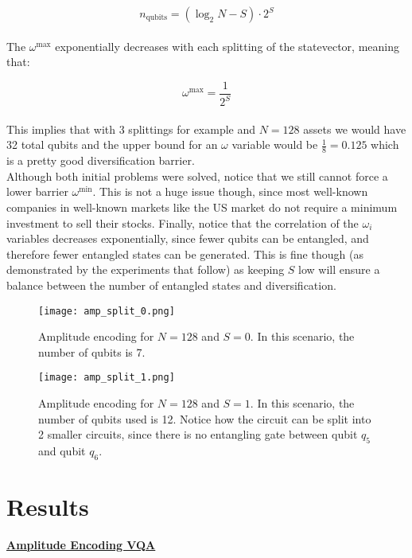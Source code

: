 \documentclass[12pt,a4paper]{report}
\begin{document}
\[
n_{\text{qubits}} = (\log_2N - S) \cdot 2^S
\]
\\
\noindent
The \(\omega^{\text{max}}\) exponentially decreases with each splitting of the statevector, meaning that:

\[
\omega^{\text{max}} = \frac{1}{2^S}
\]
\\
\noindent
This implies that with 3 splittings for example and \(N=128\) assets we would have 32 total qubits and the upper bound for an \(\omega\) variable would be \(\frac{1}{8} = 0.125\) which is a pretty good diversification barrier.
\\

\noindent
Although both initial problems were solved, notice that we still cannot force a lower barrier \(\omega^{\text{min}}\). This is not a huge issue though, since most well-known companies in well-known markets like the US market do not require a minimum investment to sell their stocks. Finally, notice that the correlation of the \(\omega_i\) variables decreases exponentially, since fewer qubits can be entangled, and therefore fewer entangled states can be generated. This is fine though (as demonstrated by the experiments that follow) as keeping \(S\) low will ensure a balance between the number of entangled states and diversification.

\newpage

\begin{figure}[!h]
    \centering
    \texttt{[image: amp\_split\_0.png]}
    \caption{Amplitude encoding for \(N=128\) and \(S = 0\). In this scenario, the number of qubits is 7.}
    \label{fig:amp_enc_split_0}
\end{figure}

\begin{figure}[!h]
    \centering
    \texttt{[image: amp\_split\_1.png]}
    \caption{Amplitude encoding for \(N=128\) and \(S=1\). In this scenario, the number of qubits used is 12. Notice how the circuit can be split into 2 smaller circuits, since there is no entangling gate between qubit \(q_5\) and qubit \(q_6\).}
    \label{fig:amp_enc_split_1}
\end{figure}

\newpage

\section{Results}

\noindent
\textbf{\underline{Amplitude Encoding VQA}}
\\
\end{document}
